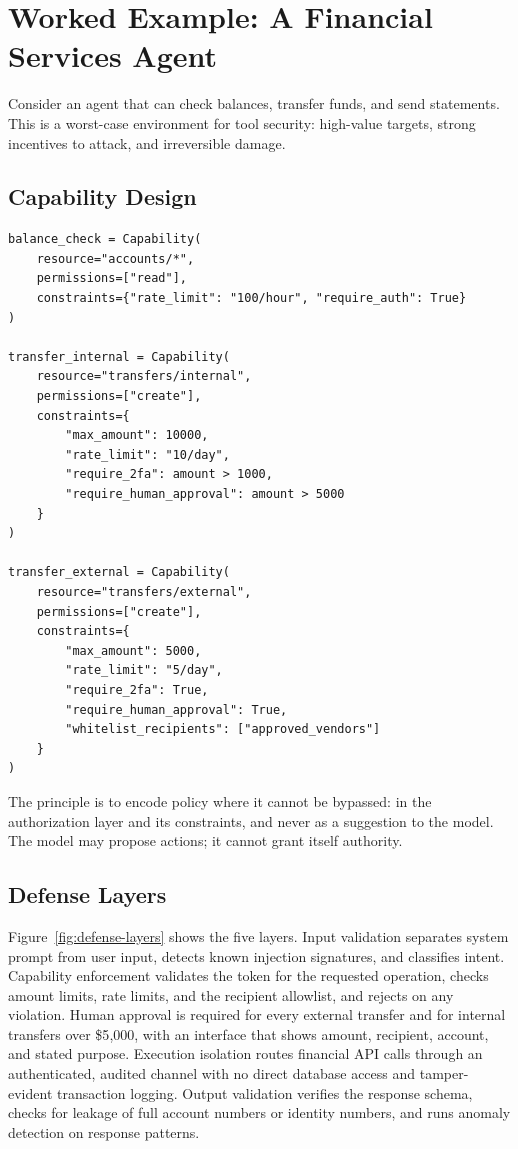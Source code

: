 \documentclass[11pt]{book}
\begin{document}
\section{Worked Example: A Financial Services Agent}

Consider an agent that can check balances, transfer funds, and send statements. This is a worst-case environment for tool security: high-value targets, strong incentives to attack, and irreversible damage.

\subsection{Capability Design}

\begin{verbatim}
balance_check = Capability(
    resource="accounts/*",
    permissions=["read"],
    constraints={"rate_limit": "100/hour", "require_auth": True}
)

transfer_internal = Capability(
    resource="transfers/internal",
    permissions=["create"],
    constraints={
        "max_amount": 10000,
        "rate_limit": "10/day",
        "require_2fa": amount > 1000,
        "require_human_approval": amount > 5000
    }
)

transfer_external = Capability(
    resource="transfers/external",
    permissions=["create"],
    constraints={
        "max_amount": 5000,
        "rate_limit": "5/day",
        "require_2fa": True,
        "require_human_approval": True,
        "whitelist_recipients": ["approved_vendors"]
    }
)
\end{verbatim}

The principle is to encode policy where it cannot be bypassed: in the authorization layer and its constraints, and never as a suggestion to the model. The model may propose actions; it cannot grant itself authority.

\subsection{Defense Layers}

Figure~\ref{fig:defense-layers} shows the five layers. Input validation separates system prompt from user input, detects known injection signatures, and classifies intent. Capability enforcement validates the token for the requested operation, checks amount limits, rate limits, and the recipient allowlist, and rejects on any violation. Human approval is required for every external transfer and for internal transfers over \$5{,}000, with an interface that shows amount, recipient, account, and stated purpose. Execution isolation routes financial API calls through an authenticated, audited channel with no direct database access and tamper-evident transaction logging. Output validation verifies the response schema, checks for leakage of full account numbers or identity numbers, and runs anomaly detection on response patterns.
\end{document}
